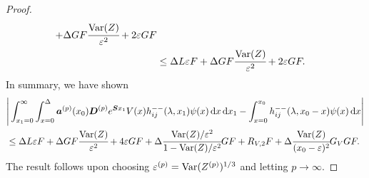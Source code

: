 \begin{proof}
\begin{align}
		+\Delta GF \cfrac{\mathrm{Var}(Z)}{\varepsilon^2} + 2\varepsilon GF
		\\&\leq \Delta L\varepsilon   F 
		+\Delta GF \cfrac{\mathrm{Var}(Z)}{\varepsilon^2} + 2\varepsilon GF.\label{eqn: LLLaase}
	\end{align}
	In summary, we have shown 
	\begin{align}
		&\Bigg|\int_{x_1=0}^\infty \int_{x=0}^{\Delta}\boldsymbol a^{(p)}(x_0) \boldsymbol D^{(p)} e^{\boldsymbol S x_1} V(x) h_{ij}^{--}(\lambda, x_1) \psi(x) \, \mathrm{d} x \, \mathrm{d} x_1 
		- \int_{x=0}^{x_0} h_{ij}^{--}(\lambda,x_0-x)\psi(x)\, \mathrm{d} x \Bigg| \nonumber 
		\\& \leq  \Delta L\varepsilon   F 
		+\Delta GF \cfrac{\mathrm{Var}(Z)}{\varepsilon^2} + 4\varepsilon GF + \Delta \cfrac{\mathrm{Var}(Z)/\varepsilon^2}{1-\mathrm{Var}(Z)/\varepsilon^2}GF + R_{V,2} F +  \Delta \cfrac{\mathrm{Var}(Z)}{(x_0-\varepsilon)^2} G_V G F.
	\end{align}
	The result follows upon choosing \(\varepsilon^{(p)}=\mathrm{Var}(Z^{(p)})^{1/3}\) and letting \(p\to\infty\). 
\end{proof}

